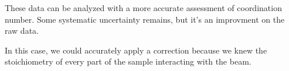 \documentclass[10pt, xcolor=x11names, compress]{beamer}
\begin{document}
\begin{frame}
\begin{columns}
\begin{column}{0.33\linewidth}
    \end{column}
  \end{columns}

  \bigskip

  These data can be analyzed with a more accurate assessment of
  coordination number.  Some systematic uncertainty remains, but it's
  an improvment on the raw data.

  \bigskip

  \begin{exampleblock}{}
    In this case, we could accurately apply a correction because we
    knew the stoichiometry of every part of the sample interacting
    with the beam.
  \end{exampleblock}

\end{frame}
\end{document}
